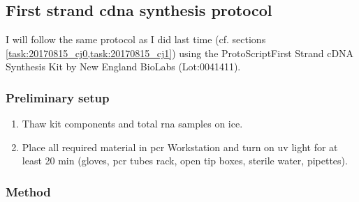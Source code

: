 \subsection{First strand \gls{cdna} synthesis protocol}
\label{task:20180106_cj0}

I will follow the same protocol as I did last time (cf. sections \ref{task:20170815_cj0,task:20170815_cj1}) using the ProtoScript\cR First Strand cDNA Synthesis Kit by New England BioLabs (Lot:0041411).

\subsubsection{Preliminary setup}


\begin{enumerate}
\item Thaw kit components and total \gls{rna} samples on ice.
\item Place all required material in \gls{pcr} Workstation and turn on \gls{uv} light for at least 20 min (gloves, \gls{pcr} tubes rack, open tip boxes, sterile water, pipettes).
\end{enumerate}

\subsubsection{Method}

